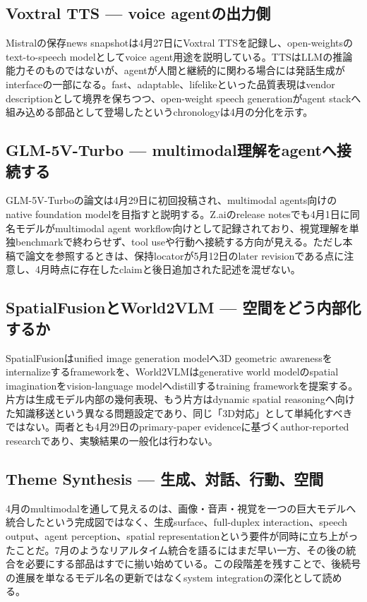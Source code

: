 \subsection{Voxtral TTS — voice agentの出力側}

Mistralの保存news snapshotは4月27日にVoxtral TTSを記録し、open-weightsのtext-to-speech modelとしてvoice agent用途を説明している。TTSはLLMの推論能力そのものではないが、agentが人間と継続的に関わる場合には発話生成がinterfaceの一部になる。fast、adaptable、lifelikeといった品質表現はvendor descriptionとして境界を保ちつつ、open-weight speech generationがagent stackへ組み込める部品として登場したというchronologyは4月の分化を示す。\autocite{src-d8b7c1c36830}


\subsection{GLM-5V-Turbo — multimodal理解をagentへ接続する}

GLM-5V-Turboの論文は4月29日に初回投稿され、multimodal agents向けのnative foundation modelを目指すと説明する。Z.aiのrelease notesでも4月1日に同名モデルがmultimodal agent workflow向けとして記録されており、視覚理解を単独benchmarkで終わらせず、tool useや行動へ接続する方向が見える。ただし本稿で論文を参照するときは、保持locatorが5月12日のlater revisionである点に注意し、4月時点に存在したclaimと後日追加された記述を混ぜない。\autocite{src-d113b486a585}


\subsection{SpatialFusionとWorld2VLM — 空間をどう内部化するか}

SpatialFusionはunified image generation modelへ3D geometric awarenessをinternalizeするframeworkを、World2VLMはgenerative world modelのspatial imaginationをvision-language modelへdistillするtraining frameworkを提案する。片方は生成モデル内部の幾何表現、もう片方はdynamic spatial reasoningへ向けた知識移送という異なる問題設定であり、同じ「3D対応」として単純化すべきではない。両者とも4月29日のprimary-paper evidenceに基づくauthor-reported researchであり、実験結果の一般化は行わない。\autocite{src-3fa7f7c1140f,src-fec81b98fdc8}


\subsection{Theme Synthesis — 生成、対話、行動、空間}

4月のmultimodalを通して見えるのは、画像・音声・視覚を一つの巨大モデルへ統合したという完成図ではなく、生成surface、full-duplex interaction、speech output、agent perception、spatial representationという要件が同時に立ち上がったことだ。7月のようなリアルタイム統合を語るにはまだ早い一方、その後の統合を必要にする部品はすでに揃い始めている。この段階差を残すことで、後続号の進展を単なるモデル名の更新ではなくsystem integrationの深化として読める。\autocite{src-0f697d747d9c,src-3fa7f7c1140f,src-d113b486a585,src-d33ba68aac3c,src-d8b7c1c36830,src-fec81b98fdc8}


